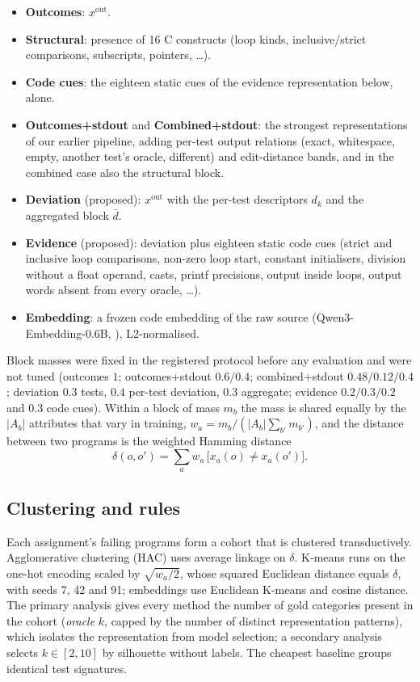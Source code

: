 \begin{itemize}
\item \textbf{Outcomes}: $x^{\mathrm{out}}$.
\item \textbf{Structural}: presence of 16 C constructs (loop kinds, inclusive/strict comparisons, subscripts, pointers, \dots).
\item \textbf{Code cues}: the eighteen static cues of the evidence representation below, alone.
\item \textbf{Outcomes+stdout} and \textbf{Combined+stdout}: the strongest representations of our earlier pipeline, adding per-test output relations (exact, whitespace, empty, another test's oracle, different) and edit-distance bands, and in the combined case also the structural block.
\item \textbf{Deviation} (proposed): $x^{\mathrm{out}}$ with the per-test descriptors $d_k$ and the aggregated block $\bar d$.
\item \textbf{Evidence} (proposed): deviation plus eighteen static code cues (strict and inclusive loop comparisons, non-zero loop start, constant initialisers, division without a float operand, casts, printf precisions, output inside loops, output words absent from every oracle, \dots).
\item \textbf{Embedding}: a frozen code embedding of the raw source (Qwen3-Embedding-0.6B, \citealt{zhang2025qwen3embedding}), L2-normalised.
\end{itemize}
Block masses were fixed in the registered protocol before any evaluation and were not tuned (outcomes $1$; outcomes+stdout $0.6/0.4$; combined+stdout $0.48/0.12/0.4$; deviation $0.3$ tests, $0.4$ per-test deviation, $0.3$ aggregate; evidence $0.2/0.3/0.2$ and $0.3$ code cues). Within a block of mass $m_b$ the mass is shared equally by the $|A_b|$ attributes that vary in training, $w_a = m_b / (|A_b| \sum_{b'} m_{b'})$, and the distance between two programs is the weighted Hamming distance
\begin{equation}
\delta(o, o') = \sum_{a} w_a \,\bigl[x_a(o) \neq x_a(o')\bigr].
\end{equation}

\subsection{Clustering and rules}
Each assignment's failing programs form a cohort that is clustered transductively. Agglomerative clustering (HAC) uses average linkage on $\delta$. K-means runs on the one-hot encoding scaled by $\sqrt{w_a/2}$, whose squared Euclidean distance equals $\delta$, with seeds 7, 42 and 91; embeddings use Euclidean K-means and cosine distance. The primary analysis gives every method the number of gold categories present in the cohort (\emph{oracle} $k$, capped by the number of distinct representation patterns), which isolates the representation from model selection; a secondary analysis selects $k\in[2,10]$ by silhouette without labels. The cheapest baseline groups identical test signatures.

